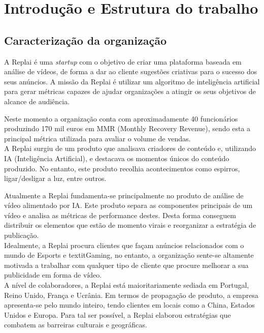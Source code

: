 \chapter{Introdução e Estrutura do trabalho}

\section{Caracterização da organização}

A Replai é uma \textit{startup} com o objetivo de criar uma plataforma baseada em análise de vídeos, de forma a dar ao cliente sugestões criativas para o sucesso dos seus anúncios. 
A missão da Replai é utilizar um algoritmo de inteligência artificial para gerar métricas capazes de ajudar organizações a atingir os seus objetivos de alcance de audiência.

Neste momento a organização conta com aproximadamente 40 funcionários produzindo 170 mil euros em MMR (Monthly Recovery Revenue), sendo esta a principal métrica utilizada para avaliar o volume de vendas.\\


A Replai surgiu de um produto que analisava criadores de conteúdo e, utilizando IA (Inteligência Artificial), e destacava os momentos únicos do conteúdo produzido. No entanto, este produto recolhia acontecimentos como espirros, ligar/desligar a luz, entre outros.

Atualmente a Replai fundamenta-se principalmente no produto de análise de vídeo alimentado por IA. 
Este produto separa as componentes principais de um vídeo e analisa as métricas de performance destes. Desta forma conseguem distribuir os elementos que estão de momento virais e reorganizar a estratégia de publicação.\\


Idealmente, a Replai procura clientes que façam anúncios relacionados com o mundo de Esports e textit{Gaming}, no entanto, a organização sente-se altamente motivada a trabalhar com qualquer tipo de cliente que procure melhorar a sua publicidade em forma de vídeo. \\

A nível de colaboradores, a Replai está maioritariamente sediada em Portugal, Reino Unido, França e Ucrânia.
Em termos de propagação de produto, a empresa apresenta-se pelo mundo inteiro, tendo clientes em locais como a China, Estados Unidos e Europa. Para tal ser possível, a Replai elaborou estratégias que combatem as barreiras culturais e geográficas. 

